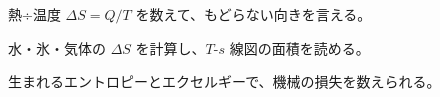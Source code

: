 \begin{furikaeri}
\begin{checklist}
\item 熱÷温度 $\Delta S=Q/T$ を数えて、もどらない向きを言える。
\item 水・氷・気体の $\Delta S$ を計算し、$T$-$s$ 線図の面積を読める。
\item 生まれるエントロピーとエクセルギーで、機械の損失を数えられる。
\end{checklist}
\end{furikaeri}
